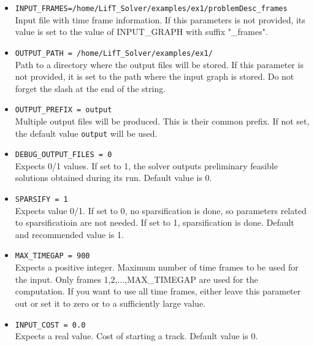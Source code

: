 \documentclass[a4paper,10pt]{article}
\begin{document}
 \begin{itemize} 
 
 \item  \texttt{INPUT\_FRAMES=/home/LifT\_Solver/examples/ex1/problemDesc\_frames}\\
 Input file with time frame information. If this parameters is not provided, its value is set to the value of INPUT\_GRAPH with suffix "\_frames".
  \item \texttt{OUTPUT\_PATH = /home/LifT\_Solver/examples/ex1/}\\
 Path to a directory where the output files will be stored. If this parameter is not provided, it is set to the path where the input graph is stored. Do not forget the slash at the end of the string.
 
 \item \texttt{OUTPUT\_PREFIX = output} \\
 Multiple output files will be produced. This is their common prefix. If not set, the default value \texttt{output} will be used.
 
 \item  \texttt{DEBUG\_OUTPUT\_FILES = 0} \\
 Expects 0/1 values. If set to 1, the solver outputs preliminary feasible solutions obtained during its run. Default value is 0.
 
 \item  \texttt{SPARSIFY = 1} \\
 Expects value 0/1. If set to 0, no sparsification is done, so parameters related to sparsificatioin are not needed. If set to 1, sparsification is done. Default and recommended value is 1.
 

 
 \item  \texttt{MAX\_TIMEGAP = 900} \\
 Expects a positive integer. Maximum number of time frames to be used for the input. Only frames 1,2,...,MAX\_TIMEGAP are used for the computation. If you want to use all time frames, either leave this parameter out or set it to zero or to a sufficiently large value. 
 
 \item  \texttt{INPUT\_COST = 0.0}\\
Expects a real value. Cost of starting a track. Default value is 0. 
 

\end{itemize}
\end{document}
